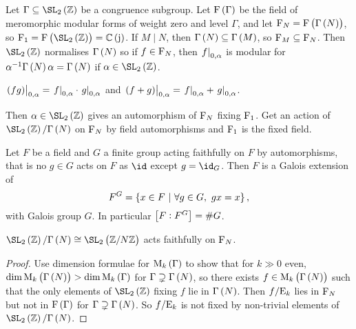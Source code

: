 
Let $ \Gamma \subseteq \SL_2\br{\ZZ} $ be a congruence subgroup. Let $ \F\br{\Gamma} $ be the field of meromorphic modular forms of weight zero and level $ \Gamma $, and let $ \F_N = \F\br{\Gamma\br{N}} $, so $ \F_1 = \F\br{\SL_2\br{\ZZ}} = \CC\br{\j} $. If $ M \mid N $, then $ \Gamma\br{N} \subseteq \Gamma\br{M} $, so $ \mathrm{F}_M \subseteq \mathrm{F}_N $. Then $ \SL_2\br{\ZZ} $ normalises $ \Gamma\br{N} $ so if $ f \in \mathrm{F}_N $, then $ \left. f \right|_{0, \alpha} $ is modular for $ \alpha^{-1}\Gamma\br{N}\alpha = \Gamma\br{N} $ if $ \alpha \in \SL_2\br{\ZZ} $.

\begin{note*}
$ \eval{\br{fg}}_{0, \alpha} = \eval{f}_{0, \alpha} \cdot \eval{g}_{0, \alpha} $ and $ \eval{\br{f + g}}_{0, \alpha} = \eval{f}_{0, \alpha} + \eval{g}_{0, \alpha} $.
\end{note*}

Then $ \alpha \in \SL_2\br{\ZZ} $ gives an automorphism of $ \mathrm{F}_N $ fixing $ \mathrm{F}_1 $. Get an action of $ \SL_2\br{\ZZ} / \Gamma\br{N} $ on $ \mathrm{F}_N $ by field automorphisms and $ \mathrm{F}_1 $ is the fixed field.

\begin{theorem}
Let $ F $ be a field and $ G $ a finite group acting faithfully on $ F $ by automorphisms, that is no $ g \in G $ acts on $ F $ as $ \id $ except $ g = \id_G $. Then $ F $ is a Galois extension of
$$ F^G = \cbr{x \in F \st \forall g \in G, \ gx = x}, $$
with Galois group $ G $. In particular $ \sbr{F : F^G} = \#G $.
\end{theorem}

\begin{proposition}
$ \SL_2\br{\ZZ} / \Gamma\br{N} \cong \SL_2\br{\ZZ / N\ZZ} $ acts faithfully on $ \mathrm{F}_N $.
\end{proposition}

\begin{proof}
Use dimension formulae for $ \M_k\br{\Gamma} $ to show that for $ k \gg 0 $ even, $ \dim \M_k\br{\Gamma\br{N}} > \dim \M_k\br{\Gamma} $ for $ \Gamma \supsetneq \Gamma\br{N} $, so there exists $ f \in \M_k\br{\Gamma\br{N}} $ such that the only elements of $ \SL_2\br{\ZZ} $ fixing $ f $ lie in $ \Gamma\br{N} $. Then $ f / \mathrm{E}_k $ lies in $ \mathrm{F}_N $ but not in $ \F\br{\Gamma} $ for $ \Gamma \supsetneq \Gamma\br{N} $. So $ f / \mathrm{E}_k $ is not fixed by non-trivial elements of $ \SL_2\br{\ZZ} / \Gamma\br{N} $.
\end{proof}

